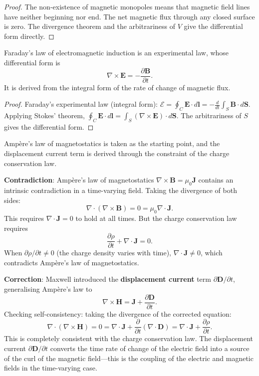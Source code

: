 \begin{proof}
The non-existence of magnetic monopoles means that magnetic field lines have neither beginning nor end. The net magnetic flux through any closed surface is zero. The divergence theorem and the arbitrariness of $V$ give the differential form directly.
\end{proof}

\begin{theorem}\label{thm:faraday_derivation}
Faraday's law of electromagnetic induction is an experimental law, whose differential form is
\[
\boxed{\nabla \times \mathbf{E} = -\frac{\partial \mathbf{B}}{\partial t}}.
\]
It is derived from the integral form of the rate of change of magnetic flux.
\end{theorem}

\begin{proof}
Faraday's experimental law (integral form): $\mathcal{E} = \oint_C \mathbf{E}\cdot d\mathbf{l} = -\frac{d}{dt}\int_S \mathbf{B}\cdot d\mathbf{S}$. Applying Stokes' theorem, $\oint_C \mathbf{E}\cdot d\mathbf{l} = \int_S (\nabla\times\mathbf{E})\cdot d\mathbf{S}$. The arbitrariness of $S$ gives the differential form.
\end{proof}

\begin{theorem}\label{thm:ampere_maxwell_derivation}
Amp\`ere's law of magnetostatics is taken as the starting point, and the displacement current term is derived through the constraint of the charge conservation law.

\textbf{Contradiction}: Amp\`ere's law of magnetostatics $\nabla \times \mathbf{B} = \mu_0 \mathbf{J}$ contains an intrinsic contradiction in a time-varying field. Taking the divergence of both sides:
\[
\nabla \cdot (\nabla \times \mathbf{B}) = 0 = \mu_0 \nabla \cdot \mathbf{J}.
\]
This requires $\nabla \cdot \mathbf{J} = 0$ to hold at all times. But the charge conservation law requires
\[
\frac{\partial \rho}{\partial t} + \nabla \cdot \mathbf{J} = 0.
\]
When $\partial\rho/\partial t \neq 0$ (the charge density varies with time), $\nabla \cdot \mathbf{J} \neq 0$, which contradicts Amp\`ere's law of magnetostatics.

\textbf{Correction}: Maxwell introduced the \textbf{displacement current} term $\partial\mathbf{D}/\partial t$, generalising Amp\`ere's law to
\[
\boxed{\nabla \times \mathbf{H} = \mathbf{J} + \frac{\partial \mathbf{D}}{\partial t}}.
\]
Checking self-consistency: taking the divergence of the corrected equation:
\[
\nabla \cdot (\nabla \times \mathbf{H}) = 0 = \nabla \cdot \mathbf{J} + \frac{\partial}{\partial t}(\nabla \cdot \mathbf{D}) = \nabla \cdot \mathbf{J} + \frac{\partial\rho}{\partial t}.
\]
This is completely consistent with the charge conservation law. The displacement current $\partial\mathbf{D}/\partial t$ converts the time rate of change of the electric field into a source of the curl of the magnetic field---this is the coupling of the electric and magnetic fields in the time-varying case.
\end{theorem}

